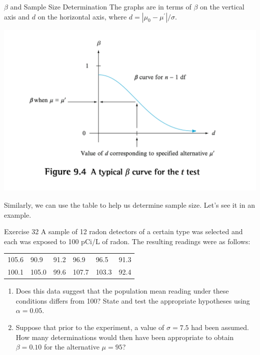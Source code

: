 \documentclass[
  ignorenonframetext,
]{beamer}
\providecommand{\tightlist}{%
  \setlength{\itemsep}{0pt}\setlength{\parskip}{0pt}}\usepackage{longtable,booktabs,array}
\begin{document}
\begin{frame}{\(\beta\) and Sample Size Determination}
\protect\hypertarget{beta-and-sample-size-determination-3}{}
The graphs are in terms of \(\beta\) on the vertical axis and \(d\) on
the horizontal axis, where \(d = |\mu_{0} - \mu^{\prime}|/\sigma\).

\includegraphics{images/betacurve.png}

Similarly, we can use the table to help us determine sample size. Let's
see it in an example.
\end{frame}

\begin{frame}{Exercise 32}
\protect\hypertarget{exercise-32}{}
A sample of 12 radon detectors of a certain type was selected and each
was exposed to 100 pCi/L of radon. The resulting readings were as
follows:

\begin{longtable}[]{@{}llllll@{}}
\toprule()
\endhead
105.6 & 90.9 & 91.2 & 96.9 & 96.5 & 91.3 \\
100.1 & 105.0 & 99.6 & 107.7 & 103.3 & 92.4 \\
\bottomrule()
\end{longtable}

\begin{enumerate}[<+->]
[a.]
\tightlist
\item
  Does this data suggest that the population mean reading under these
  conditions differs from 100? State and test the appropriate hypotheses
  using \(\alpha = 0.05\).
\item
  Suppose that prior to the experiment, a value of \(\sigma = 7.5\) had
  been assumed. How many determinations would then have been appropriate
  to obtain \(\beta = 0.10\) for the alternative \(\mu = 95\)?
\end{enumerate}
\end{frame}
\end{document}
